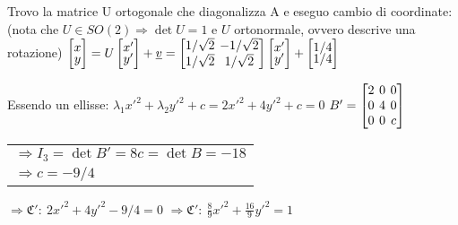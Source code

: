 Trovo la matrice U ortogonale che diagonalizza A e eseguo cambio di coordinate:
(nota che $U \in SO(2) \Rightarrow \det U = 1$ e $U$ ortonormale, ovvero descrive una rotazione)
$
\begin{bmatrix}
	x \\[-0.3em]
	y \\
\end{bmatrix}
= U
\begin{bmatrix}
	x' \\[-0.3em]
	y' \\
\end{bmatrix}
+ \vec{v}=
\left[
	\arraycolsep=2.0pt\def\arraystretch{1.0}
	\begin{array}{@{}cc@{}}
		1/\sqrt{2} & -1/\sqrt{2} \\
		1/\sqrt{2} & 1/\sqrt{2}
	\end{array}
\right]
\begin{bmatrix}
	x' \\[-0.3em]
	y' \\
\end{bmatrix}
+
\begin{bmatrix}
	1/4 \\[-0.3em]
	1/4 \\
\end{bmatrix}
$

Essendo un ellisse: $\lambda_1x'^2 + \lambda_2y'^2 + c = 2x'^2 + 4y'^2 + c = 0$
$
B' = \left[
	\arraycolsep=2.0pt\def\arraystretch{1.0}
	\begin{array}{@{}ccc@{}}
		2 & 0 & 0 \\
		0 & 4 & 0 \\
		0 & 0 & c \\
	\end{array}
\right]
$
\begin{tabular}{l}
	$\Rightarrow I_3 = \det B' = 8c = \det B = -18$ \\
	$\Rightarrow c = -9/4$
\end{tabular}
$\Rightarrow \mathfrak{C'}:\ 2x'^2 + 4y'^2 -9/4 = 0$
$\Rightarrow \mathfrak{C'}:\ \frac{8}{9}x'^2 + \frac{16}{9}y'^2 = 1$
